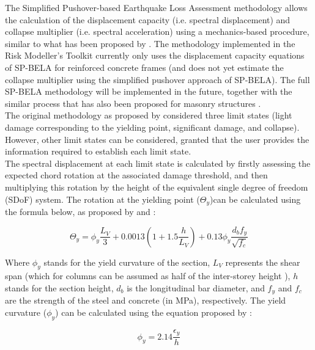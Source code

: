 The Simplified Pushover-based Earthquake Loss Assessment methodology \citep{BorziEtAl2008b} allows the calculation of the displacement capacity (i.e. spectral displacement) and collapse multiplier (i.e. spectral acceleration) using a mechanics-based procedure, similar to what has been proposed by \citet{CosenzaEtAl2005}. The methodology implemented in the Risk Modeller's Toolkit currently only uses the displacement capacity equations of SP-BELA for reinforced concrete frames (and does not yet estimate the collapse multiplier using the simplified pushover approach of SP-BELA). The full SP-BELA methodology will be implemented in the future, together with the similar process that has also been proposed for masonry structures \citep{BorziEtAl2008a}.\\

The original methodology as proposed by \citet{BorziEtAl2008b} considered three limit states (light damage corresponding to the yielding point, significant damage, and collapse). However, other limit states can be considered, granted that the user provides the information required to establish each limit state.\\

The spectral displacement at each limit state is calculated by firstly assessing the expected chord rotation at the associated damage threshold, and then multiplying this rotation by the height of the equivalent single degree of freedom (SDoF) system. The rotation at the yielding point ($\Theta_y$)can be calculated using the formula below, as proposed by \citet{CosenzaEtAl2005} and \citet{PanagiotakosFardis2001}:

\begin{equation}
	\Theta_y = \phi_y\frac{L_V}{3}+0.0013\left(1 + 1.5\frac{h}{L_V}\right)+0.13\phi_y\frac{d_bf_y}{\sqrt{f_c}}
\end{equation}

Where $\phi_y$ stands for the yield curvature of the section, $L_V$ represents the shear span (which for columns can be assumed as half of the inter-storey height \citep{BorziEtAl2008b}), $h$ stands for the section height, $d_b$ is the longitudinal bar diameter, and $f_y$ and $f_c$ are the strength of the steel and concrete (in MPa), respectively. The yield curvature ($\phi_y$) can be calculated using the equation proposed by \cite{PriestleyEtAl2007}:

\begin{equation}
	\phi_y = 2.14\frac{\epsilon_y}{h}
\end{equation}


